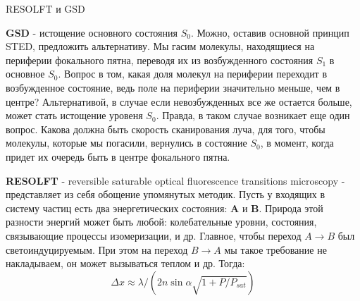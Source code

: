 \documentclass[9pt, compress, xcolor=table]{beamer}
\begin{document}
\begin{frame}{RESOLFT и GSD}

{\small \textcolor{red!50!black}{\textbf{GSD}} - истощение основного состояния $S_0$. Можно, оставив основной принцип STED, предложить альтернативу. Мы гасим молекулы, находящиеся на периферии фокального пятна, переводя их из возбужденного состояния $S_1$ в основное $S_0$. Вопрос в том, какая доля молекул на периферии переходит в возбужденное состояние, ведь поле на периферии значительно меньше, чем в центре? Альтернативой, в случае если невозбужденных все же остается больше, может стать истощение уровеня $S_0$. Правда, в таком случае возникает еще один вопрос. Какова должна быть скорость сканирования луча, для того, чтобы молекулы, которые мы погасили, вернулись в состояние $S_0$, в момент, когда придет их очередь быть в центре фокального пятна.}

{\small \textcolor{red!50!black}{\textbf{RESOLFT}} - reversible saturable optical fluorescence transitions microscopy - представляет из себя обощение упомянутых методик. Пусть у входящих в систему частиц есть два энергетических состояния: \textbf{A} и \textbf{B}. Природа этой разности энергий может быть любой: колебательные уровни, состояния, связывающие процессы изомеризации, и др. Главное, чтобы переход $A\rightarrow B$ был светоиндуцируемым. При этом на переход $B\rightarrow A$ мы такое требование не накладываем, он может вызываться теплом и др. Тогда:}
\begin{equation*}
\Delta x \approx \lambda/(2n \sin \alpha \sqrt{1+P/P_{sat}})
\end{equation*}

\end{frame}
\end{document}
